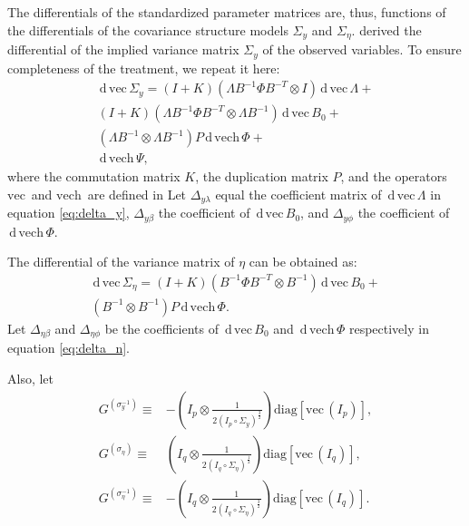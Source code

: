 \documentclass[a4paper,11pt]{article}
\newcommand{\n}{\eta}
\renewcommand{\l}{\lambda}
\renewcommand{\b}{\beta}
\newcommand{\p}{\phi}
\renewcommand{\d}{\,\mathrm{d}\,}
\newcommand{\definedas}{\equiv}
\newcommand{\kronprod}{\otimes}
\newcommand{\hadaprod}{\circ}
\newcommand{\diag}{\mathrm{diag}}
\renewcommand{\vec}{\mathrm{vec}\,}
\newcommand{\vech}{\mathrm{vech}\,}
\newcommand{\0}{\boldsymbol{0}}
\begin{document}
The differentials of the standardized parameter matrices are, thus, 
functions of the differentials of the covariance structure models $\Sigma_y$
and
$\Sigma_\n$.
\cite{neudecker1991linear} derived the differential of the implied variance
matrix $\Sigma_y$ of the observed variables. To ensure completeness of the treatment, we repeat it here:
\begin{equation}\label{eq:delta_y}
\begin{split}
\d\vec \Sigma_y = (I + K) (\Lambda B^{-1} \Phi B^{-T} \kronprod I) 
\d\vec\Lambda 
+ \\
(I + K) (\Lambda B^{-1} \Phi B^{-T} \kronprod \Lambda B^{-1}) \d\vec B_0
+ \\
(\Lambda B^{-1} \kronprod \Lambda B^{-1}) P \d \vech \Phi
+ \\
\d \vech \Psi,
\end{split}
\end{equation}
where the commutation matrix $K$, the duplication matrix $P$, and the operators
$\vec$ and $\vech$ are defined in \cite{magnus1988matrix}
Let $\Delta_{y\l}$ equal the coefficient matrix
 of $\d\vec\Lambda$ in equation \ref{eq:delta_y}, 
$\Delta_{y\b}$ the coefficient  of $\d\vec B_0$, and
$\Delta_{y\phi}$ the coefficient  of $\d\vech\Phi$.


The differential of the variance matrix of $\n$ can be obtained as:
\begin{equation}\label{eq:delta_n}
\begin{split}
\d\vec \Sigma_\n = 
(I + K) (B^{-1} \Phi B^{-T} \kronprod  B^{-1}) \d\vec B_0
+ \\
(B^{-1} \kronprod  B^{-1}) P \d \vech \Phi.
\end{split}
\end{equation}
Let $\Delta_{\n\b}$ and $\Delta_{\n\p}$  be the coefficients of $\d\vec B_0$ and
$\d\vech\Phi$ respectively in equation \ref{eq:delta_n}.

Also, let
\begin{align}
    G^{(\sigma^{-1}_y)} \definedas&
        - (I_p \kronprod \frac{1}{2 (I_p \hadaprod \Sigma_y)^{\frac{3}{2}}})
        \diag[\vec(I_p)],
\\
    G^{(\sigma_\n)} \definedas&
        (I_q \kronprod \frac{1}{2 (I_q \hadaprod \Sigma_\n)^{\frac{1}{2}}})
        \diag[\vec(I_q)],
\\
    G^{(\sigma^{-1}_\n)} \definedas&
        - (I_q \kronprod \frac{1}{2 (I_q \hadaprod \Sigma_\n)^{\frac{3}{2}}})
        \diag[\vec(I_q)].
\end{align}
\end{document}
